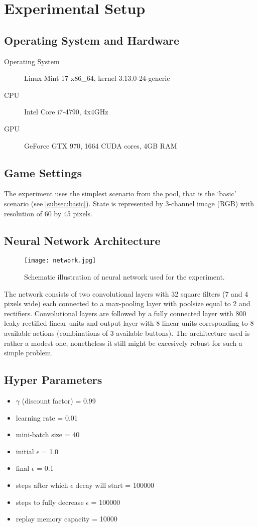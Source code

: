 \section{Experimental Setup} 
	\subsection{Operating System and Hardware}
	\begin{description}
		\item[Operating System] Linux Mint 17 x86\_64, kernel 3.13.0-24-generic
		\item[CPU] Intel Core i7-4790, 4x4GHz
		\item[GPU] GeForce GTX 970, 1664 CUDA cores, 4GB RAM
	\end{description}

	\subsection{Game Settings}
		The experiment uses the simplest scenario from the pool, that is the `basic' scenario (see \ref{subsec:basic}). State is represented by 3-channel image (RGB) with resolution of 60 by 45 pixels.

	\subsection{Neural Network Architecture}
		\begin{figure}
			\centering
			\texttt{[image: network.jpg]}
			\caption{Schematic illustration of neural network used for the experiment.}\label{fig:network}
		\end{figure}
		 The network consists of two convolutional layers with 32 square filters (7 and 4 pixels wide) each connected to a max-pooling layer with poolsize equal to 2 and rectifiers. Convolutional layers are followed by a fully connected layer with 800 leaky rectified linear units and output layer with 8 linear units coresponding to 8 available actions (combinations of 3 available buttons). The architecture used is rather a modest one, nonetheless it still might be excesively robust for such a simple problem.
	
	\subsection{Hyper Parameters}
		\begin{itemize}
		\item $\gamma$ (discount factor) = 0.99
		\item learning rate = 0.01
		\item mini-batch size = 40
		\item initial $\epsilon$ = 1.0
		\item final $\epsilon$ = 0.1
		\item steps after which $\epsilon$ decay will start = 100000
		\item steps to fully decrease $\epsilon$ = 100000
		\item replay memory  capacity = 10000
		\end{itemize}
	

